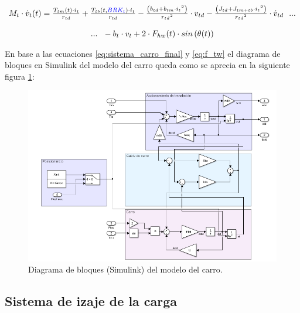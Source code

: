 \documentclass[11pt]{article}
\begin{document}
\begin{equation}
	\label{eq:sistema_carro_final}
	\begin{matrix}
		M_{t}\cdot\dot{v}_{t}(t)=\frac{T_{tm}(t)\cdot i_{t}}{r_{td}}+\frac{T_{tb}(t,{\color{blue}BRK_{t}})\cdot i_{t}}{r_{td}}-\frac{\left ( b_{td}+b_{tm}\cdot{i_{t}}^{2} \right )}{{r_{td}}^{2}}\cdot v_{td}-\frac{\left ( J_{td}+J_{tm+tb}\cdot{i_{t}}^{2} \right )}{{r_{td}}^{2}}\cdot \dot{v}_{td}\ \ ...
		\\
		\\
		...\ \ -b_{t}\cdot v_{t}+2\cdot F_{hw}(t) \cdot sin \left ( \theta(t) \right )
	\end{matrix}
\end{equation}

En base a las ecuaciones \ref{eq:sistema_carro_final} y \ref{eq:f_tw} el diagrama de bloques en Simulink del modelo del carro queda como se aprecia en la siguiente figura \ref{fig:sistema_carro_simulink}:

\begin{figure}[h!]
	\centering
	\includegraphics[width=1\textwidth]{images/imagen_3_simulink_carro.png}
	\caption{Diagrama de bloques (Simulink) del modelo del carro.}
	\label{fig:sistema_carro_simulink}
\end{figure}

\newpage

\subsection{Sistema de izaje de la carga}
\label{section:izaje}
\end{document}
